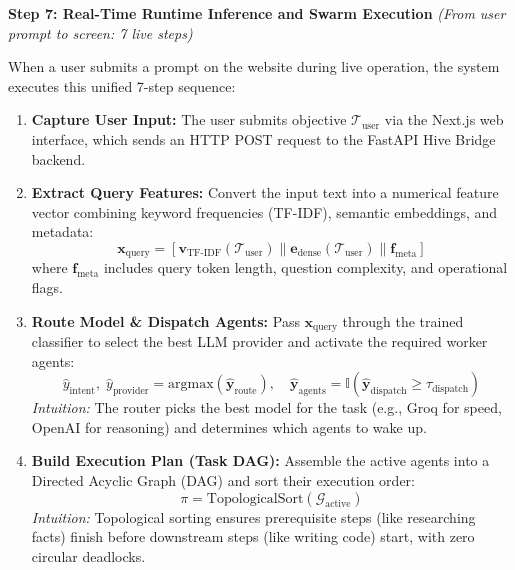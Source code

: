 \documentclass[11pt,a4paper]{article}
\begin{document}
\newpage


\textbf{Step 7: Real-Time Runtime Inference and Swarm Execution} \emph{(From user prompt to screen: 7 live steps)}

When a user submits a prompt on the website during live operation, the system executes this unified 7-step sequence:

\begin{enumerate}[leftmargin=1.5em, itemsep=0.28em, topsep=0.08em]
    \item \textbf{Capture User Input:} The user submits objective $\mathcal{T}_{\text{user}}$ via the Next.js web interface, which sends an HTTP POST request to the FastAPI Hive Bridge backend.
    
    \item \textbf{Extract Query Features:} Convert the input text into a numerical feature vector combining keyword frequencies (TF-IDF), semantic embeddings, and metadata:
    \[
    \mathbf{x}_{\text{query}} = [\mathbf{v}_{\text{TF-IDF}}(\mathcal{T}_{\text{user}}) \parallel \mathbf{e}_{\text{dense}}(\mathcal{T}_{\text{user}}) \parallel \mathbf{f}_{\text{meta}}]
    \]
    where $\mathbf{f}_{\text{meta}}$ includes query token length, question complexity, and operational flags.
    
    \item \textbf{Route Model \& Dispatch Agents:} Pass $\mathbf{x}_{\text{query}}$ through the trained classifier to select the best LLM provider and activate the required worker agents:
    \[
    \hat{y}_{\text{intent}}, \; \hat{y}_{\text{provider}} = \mathrm{argmax}(\hat{\mathbf{y}}_{\text{route}}), \quad \hat{\mathbf{y}}_{\text{agents}} = \mathbb{I}(\hat{\mathbf{y}}_{\text{dispatch}} \ge \tau_{\text{dispatch}})
    \]
    \emph{Intuition:} The router picks the best model for the task (e.g., Groq for speed, OpenAI for reasoning) and determines which agents to wake up.
    
    \item \textbf{Build Execution Plan (Task DAG):} Assemble the active agents into a Directed Acyclic Graph (DAG) and sort their execution order:
    \[
    \pi = \mathrm{TopologicalSort}(\mathcal{G}_{\text{active}})
    \]
    \emph{Intuition:} Topological sorting ensures prerequisite steps (like researching facts) finish before downstream steps (like writing code) start, with zero circular deadlocks.
    

\end{enumerate}
\end{document}

